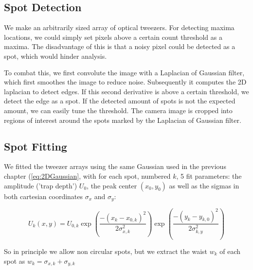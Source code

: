 \subsection{Spot Detection}

We make an arbitrarily sized array of optical tweezers. For detecting maxima locations, we could simply set pixels above a certain count threshold as a maxima. The disadvantage of this is that a noisy pixel could be detected as a spot, which would hinder analysis. 

To combat this, we first convolute the image with a Laplacian of Gaussian filter, which first smoothes the image to reduce noise. Subsequently it computes the 2D laplacian to detect edges. If this second derivative is above a certain threshold, we detect the edge as a spot. If the detected amount of spots is not the expected amount, we can easily tune the threshold. The camera image is cropped into regions of interest around the spots marked by the Laplacian of Gaussian filter. 

\subsection{Spot Fitting}

We fitted the tweezer arrays using the same Gaussian used in the previous chapter (\cref{eq:2DGaussian}, with for each spot, numbered $k$, 5 fit parameters: the amplitude ('trap depth') $U_0$, the peak center $(x_0, y_0)$ as well as the sigmas in both cartesian coordinates $\sigma_x$ and $\sigma_y$:

\begin{equation}\label{eq:2DGaussianNumberK}
    U_k(x,y) = U_{0,k}\exp{\left(\frac{-(x_k-x_{0,k})^2}{2\sigma_{x,k}^2}\right)}
    \exp{\left( \frac{-(y_k-y_{k,0})^2}{2\sigma_{k,y}^2} \right)}
\end{equation}

So in principle we allow non circular spots, but we extract the waist $w_k$ of each spot as $w_k = \sigma_{x,k} + \sigma_{y,k}$